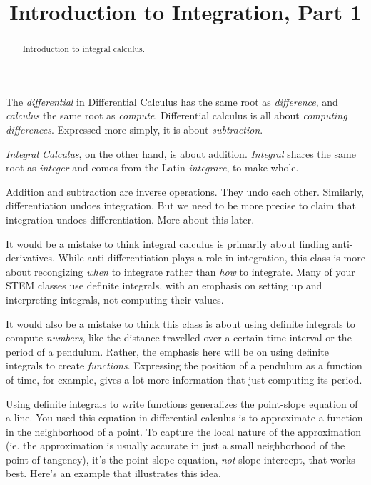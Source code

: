 \documentclass{ximera}
\title{Introduction to Integration, Part 1}
\begin{document}
\begin{abstract}
Introduction to integral calculus.
\end{abstract}
\maketitle

The \emph{differential} in Differential Calculus has the same root as \emph{difference}, and \emph{calculus} the same root as \emph{compute}. Differential calculus is all about \emph{computing differences}. Expressed more simply, it is about \emph{subtraction}.

\emph{Integral Calculus}, on the other hand, is about addition. \emph{Integral} shares the same root as \emph{integer} and comes from the Latin \emph{integrare}, to make whole. 

Addition and subtraction are inverse operations. They undo each other. Similarly, differentiation undoes integration. But we need to be more precise to claim that integration undoes differentiation. More about this later.

It would be a mistake to think integral calculus is primarily about finding anti-derivatives. While anti-differentiation plays a role in integration, this class is more about recongizing \emph{when} to integrate rather than \emph{how} to integrate. Many of your STEM classes use definite integrals, with an emphasis on setting up and interpreting integrals, not computing their values. 

It would also be a mistake to think this class is about using definite integrals to compute \emph{numbers}, like the distance travelled over a certain time interval or the period of a pendulum. Rather, the emphasis here will be on using definite integrals to create \emph{functions}. Expressing the position of a pendulum as a function of time, for example, gives a lot more information that just computing its period. 

Using definite integrals to write functions generalizes the point-slope equation of a line. You used this equation in differential calculus is to approximate a function in the neighborhood of a point. To capture the local nature of the approximation (ie. the approximation is usually accurate in just a small neighborhood of the point of tangency), it's the point-slope equation, \emph{not} slope-intercept, that works best. Here's an example that illustrates this idea.   %
\end{document}

